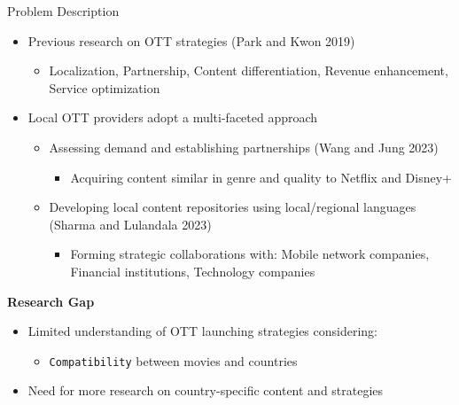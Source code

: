 \documentclass[
  ignorenonframetext,
]{beamer}
\providecommand{\tightlist}{%
  \setlength{\itemsep}{0pt}\setlength{\parskip}{0pt}}\usepackage{longtable,booktabs,array}
\begin{document}
\begin{frame}[fragile]{Problem Description}
\protect\hypertarget{problem-description}{}
\begin{itemize}
\item
  Previous research on OTT strategies (Park and Kwon 2019)

  \begin{itemize}
  \tightlist
  \item
    Localization, Partnership, Content differentiation, Revenue
    enhancement, Service optimization
  \end{itemize}
\item
  Local OTT providers adopt a multi-faceted approach

  \begin{itemize}
  \item
    Assessing demand and establishing partnerships (Wang and Jung 2023)

    \begin{itemize}
    \tightlist
    \item
      Acquiring content similar in genre and quality to Netflix and
      Disney+
    \end{itemize}
  \item
    Developing local content repositories using local/regional languages
    (Sharma and Lulandala 2023)

    \begin{itemize}
    \tightlist
    \item
      Forming strategic collaborations with: Mobile network companies,
      Financial institutions, Technology companies
    \end{itemize}
  \end{itemize}
\end{itemize}

\textbf{Research Gap}

\begin{itemize}
\item
  Limited understanding of OTT launching strategies considering:

  \begin{itemize}
  \tightlist
  \item
    \texttt{Compatibility} between movies and countries
  \end{itemize}
\item
  Need for more research on country-specific content and strategies
\end{itemize}
\end{frame}
\end{document}
